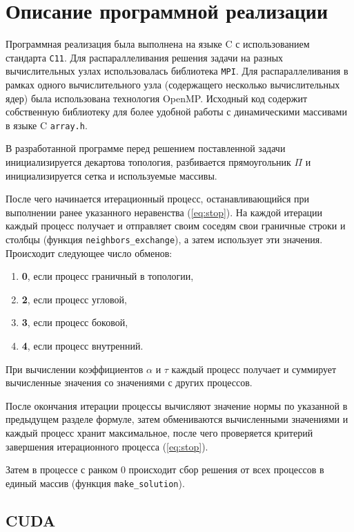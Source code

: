 \section{Описание программной реализации}

Программная реализация была выполнена на языке C с использованием стандарта \texttt{C11}. Для распараллеливания решения задачи на разных вычислительных узлах использовалась библиотека \texttt{MPI}. Для распараллеливания в рамках одного вычислительного узла (содержащего несколько вычислительных ядер) была использована технология OpenMP. Исходный код содержит собственную библиотеку для более удобной работы с динамическими массивами в языке C \texttt{array.h}.

В разработанной программе перед решением поставленной задачи инициализируется декартова топология, разбивается прямоугольник $\Pi$ и инициализируется сетка и используемые массивы.

После чего начинается итерационный процесс, останавливающийся при выполнении ранее указанного неравенства (\ref{eq:stop}). На каждой итерации каждый процесс получает и отправляет своим соседям свои граничные строки и столбцы (функция \texttt{neighbors\_exchange}), а затем использует эти значения. Происходит следующее число обменов:
\begin{enumerate}[label=\arabic*)]
  \item \textbf{0}, если процесс граничный в топологии,
  \item \textbf{2}, если процесс угловой,
  \item \textbf{3}, если процесс боковой,
  \item \textbf{4}, если процесс внутренний.
\end{enumerate}

При вычислении коэффициентов $\alpha$ и $\tau$ каждый процесс получает и суммирует вычисленные значения со значениями с других процессов.

После окончания итерации процессы вычисляют значение нормы по указанной в предыдущем разделе формуле, затем обмениваются вычисленными значениями и каждый процесс хранит максимальное, после чего проверяется критерий завершения итерационного процесса (\ref{eq:stop}).

Затем в процессе с ранком 0 происходит сбор решения от всех процессов в единый массив (функция \texttt{make\_solution}).

\subsection{CUDA}

